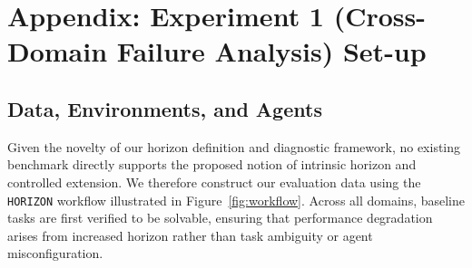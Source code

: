 \documentclass[11pt]{article}
\begin{document}
\clearpage



\twocolumn
\section{Appendix: Experiment 1 (Cross-Domain Failure Analysis) Set-up} \label{app:2}



\subsection{Data, Environments, and Agents}
Given the novelty of our horizon definition and diagnostic framework, no existing benchmark directly supports the proposed notion of intrinsic horizon and controlled extension. We therefore construct our evaluation data using the \texttt{HORIZON} workflow illustrated in Figure~\ref{fig:workflow}. Across all domains, baseline tasks are first verified to be solvable, ensuring that performance degradation arises from increased horizon rather than task ambiguity or agent misconfiguration.
\end{document}
